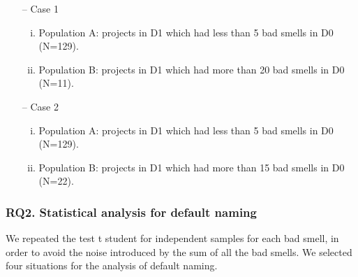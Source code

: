 \begin{itemize}
    \item[--] Case 1
    \begin{enumerate}[(i)]
        \item Population A: projects in D1 which had less than 5 bad smells in D0 (N=129).
        \item Population B: projects in D1 which had more than 20 bad smells in D0 (N=11).
    \end{enumerate}
    \item[--] Case 2
    \begin{enumerate}[(i)]
        \item Population A: projects in D1 which had less than 5 bad smells in D0 (N=129).
        \item Population B: projects in D1 which had more than 15 bad smells in D0 (N=22).
    \end{enumerate}
\end{itemize}


\subsubsection{RQ2. Statistical analysis for default naming}
\label{subsubsec:RQ2_statistical}

We repeated the test t student for independent samples for each bad smell, in order to avoid the noise introduced by the sum of all the bad smells. We selected four situations for the analysis of default naming.

